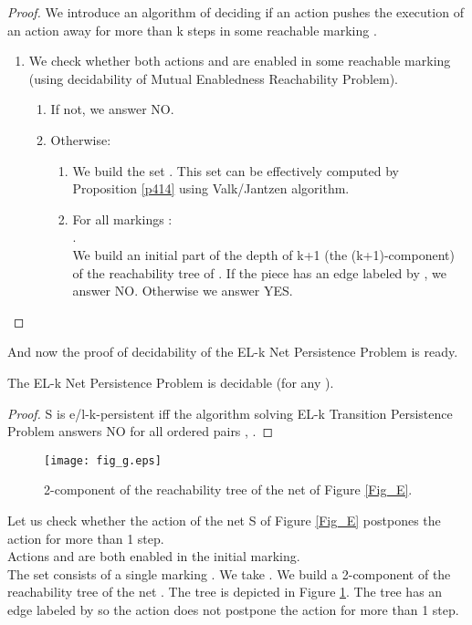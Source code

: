 \documentclass[a4paper]{llncs}
\begin{document}
\begin{proof}
We introduce an algorithm of deciding if an action  pushes the execution of an action  away for more than k steps in some reachable marking .
\begin{enumerate}
\item We check whether both actions  and  are enabled in some reachable marking (using decidability of Mutual Enabledness Reachability Problem).
\begin{enumerate}
\item If not, we answer NO.
\item Otherwise:
\begin{enumerate}
\item We build the set . This set can be effectively computed by Proposition \ref{p414} using Valk/Jantzen algorithm.
\item For all markings :\\
. \\
We build an initial part of the depth of k+1 (the (k+1)-component) of the reachability tree of . If the piece has an edge labeled by , we answer NO. Otherwise we answer YES. 	
\end{enumerate}
\end{enumerate}
\end{enumerate}
\end{proof}
And now the proof of decidability of the EL-k Net Persistence Problem is ready.

\begin{theorem}
\label{t418}
The EL-k Net Persistence Problem is decidable (for any ).
\end{theorem}

\begin{proof}
S is e/l-k-persistent iff the algorithm solving EL-k Transition Persistence Problem answers NO for all ordered pairs , .
\end{proof}
\vspace*{-1cm}
\begin{example}
\label{e_fig_g}
\begin{figure}[h]
\centering
\texttt{[image: fig\_g.eps]}
\caption{2-component of the reachability tree of the net of Figure \ref{Fig_E}.}
\label{Fig_G}
\end{figure}

Let us check whether the action  of the net S of Figure \ref{Fig_E} postpones the action  for more than 1 step.\\
Actions  and  are both enabled in the initial marking. \\
The set  consists of a single marking . 
We take . We build a 2-component of the reachability tree of the net . The tree is depicted in Figure \ref{Fig_G}. The tree has an edge labeled by  so the action  does not postpone the action  for more than 1 step.
\end{example}
\end{document}
